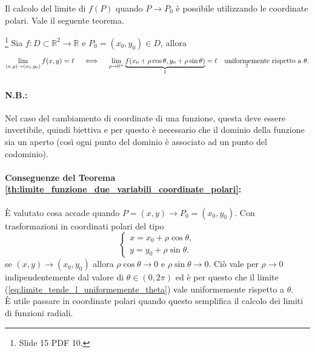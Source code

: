 Il calcolo del limite di $f(P)$ quando $P\rightarrow P_0$ è possibile utilizzando le coordinate polari. Vale il seguente teorema.
\begin{theorem}\label{th:limite_funzione_due_variabili_coordinate_polari}\footnote{Slide 15 PDF 10.}
    Sia $f\colon D\subset\mathbb R^2\rightarrow\mathbb R$ e $P_0=(x_0,y_0)\in D$, allora
    \begin{equation}\label{eq:limite_tende_l_uniformemente_theta}
        \lim\limits_{(x,y)\rightarrow(x_0,y_0)}f(x,y)=\ell\quad\iff\quad\lim\limits_{\rho\rightarrow 0^+}\underbrace{f(x_0+\rho\cos\theta,y_0+\rho\sin\theta)}_{\footnotemark}=\ell\quad\text{$\underset{\footnotemark}{\text{uniformemente}}$ rispetto a $\theta$}.
    \end{equation}
\end{theorem}
\addtocounter{footnote}{-1}


\paragraph{N.B.:} Nel caso del cambiamento di coordinate di una funzione, questa deve essere invertibile, quindi biettiva e per questo è necessario che il dominio della funzione sia un aperto (così ogni punto del dominio è associato ad un punto del codominio).

\paragraph{Conseguenze del Teorema \ref{th:limite_funzione_due_variabili_coordinate_polari}:} È valutato cosa accade quando $P=(x,y)\rightarrow P_0=(x_0,y_0)$. Con trasformazioni in coordinati polari del tipo
\begin{equation*}
    \begin{cases}
        x=x_0+\rho\cos\theta,\\
        y=y_0+\rho\sin\theta.
    \end{cases}
\end{equation*}
se $(x,y)\rightarrow(x_0,y_0)$ allora $\rho\cos\theta\rightarrow 0$ e $\rho\sin\theta\rightarrow 0$. Ciò vale per $\rho\rightarrow 0$ indipendentemente dal valore di $\theta\in(0,2\pi)$ ed è per questo che il limite (\ref{eq:limite_tende_l_uniformemente_theta}) vale uniformemente rispetto a $\theta$.\\
È utile passare in coordinate polari quando questo semplifica il calcolo dei limiti di funzioni radiali.

